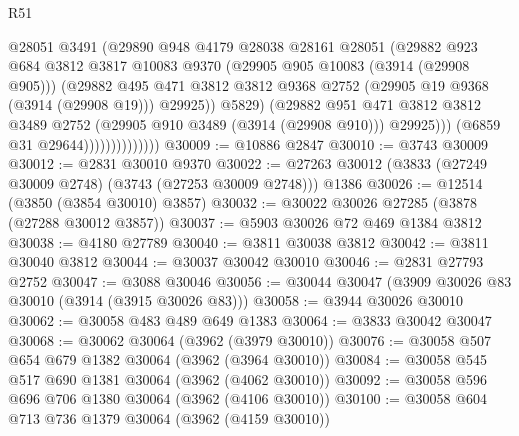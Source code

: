 \begin{lexlean}{R51}
\begin{coremodule}
                                  @28051
                                  @3491
                                  (@29890
                                    @948
                                    @4179
                                    @28038
                                    @28161
                                    @28051
                                    (@29882
                                      @923
                                      @684
                                      @3812
                                      @3817
                                      @10083
                                      @9370
                                      (@29905 @905 @10083 (@3914 (@29908 @905)))
                                      (@29882
                                        @495
                                        @471
                                        @3812
                                        @3812
                                        @9368
                                        @2752
                                        (@29905 @19 @9368 (@3914 (@29908 @19)))
                                        @29925))
                                    @5829)
                                  (@29882
                                    @951
                                    @471
                                    @3812
                                    @3812
                                    @3489
                                    @2752
                                    (@29905 @910 @3489 (@3914 (@29908 @910)))
                                    @29925)))
                              (@6859 @31 @29644))))))))))))))
@30009 := @10886 @2847
@30010 := @3743 @30009
@30012 := @2831 @30010 @9370
@30022 := @27263 @30012 (@3833 (@27249 @30009 @2748) (@3743 (@27253 @30009 @2748))) @1386
@30026 := @12514 (@3850 (@3854 @30010) @3857)
@30032 := @30022 @30026 @27285 (@3878 (@27288 @30012 @3857))
@30037 := @5903 @30026 @72 @469 @1384 @3812
@30038 := @4180 @27789
@30040 := @3811 @30038 @3812
@30042 := @3811 @30040 @3812
@30044 := @30037 @30042 @30010
@30046 := @2831 @27793 @2752
@30047 := @3088 @30046
@30056 := @30044 @30047 (@3909 @30026 @83 @30010 (@3914 (@3915 @30026 @83)))
@30058 := @3944 @30026 @30010
@30062 := @30058 @483 @489 @649 @1383
@30064 := @3833 @30042 @30047
@30068 := @30062 @30064 (@3962 (@3979 @30010))
@30076 := @30058 @507 @654 @679 @1382 @30064 (@3962 (@3964 @30010))
@30084 := @30058 @545 @517 @690 @1381 @30064 (@3962 (@4062 @30010))
@30092 := @30058 @596 @696 @706 @1380 @30064 (@3962 (@4106 @30010))
@30100 := @30058 @604 @713 @736 @1379 @30064 (@3962 (@4159 @30010))

\end{coremodule}
\end{lexlean}
